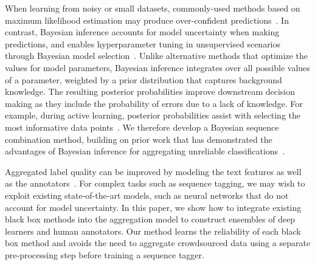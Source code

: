 When learning from noisy or small datasets, commonly-used
methods based on maximum likelihood estimation may produce over-confident predictions~\cite{xiong2011bayesian,srivastava2014dropout}. 
In contrast, Bayesian inference accounts for model uncertainty when making predictions,
and enables hyperparameter tuning in unsupervised scenarios through Bayesian model selection~\cite{Bishop2006}. 
Unlike alternative methods that optimize the values for model parameters, Bayesian inference
integrates over all possible values of a parameter, weighted by a prior distribution that captures background knowledge.
The resulting posterior probabilities improve downstream decision making
as they include the probability of errors due to a lack of knowledge. For example, 
during active learning, posterior probabilities assist with selecting the most informative data points~\cite{settles2010active}.
We therefore develop a Bayesian sequence combination method, building on prior work that has demonstrated the advantages of Bayesian inference for aggregating unreliable classifications~\cite{kim2012bayesian,simpsonlong,Felt2016SemanticAA,paun2018comparing}. 

Aggregated label quality can be improved by modeling the text features as well as the annotators~\cite{simpson2015language,Felt2016SemanticAA}.
For complex tasks such as sequence tagging, 
we may wish to exploit existing state-of-the-art models, such as neural networks
that do not account for model uncertainty.
In this paper, we show how to integrate existing black box methods into the aggregation model 
to construct ensembles of deep learners and human annotators. 
Our method learns the reliability of each black box method
and avoids the need to aggregate crowdsourced data using a separate pre-processing step 
before training a sequence tagger.


